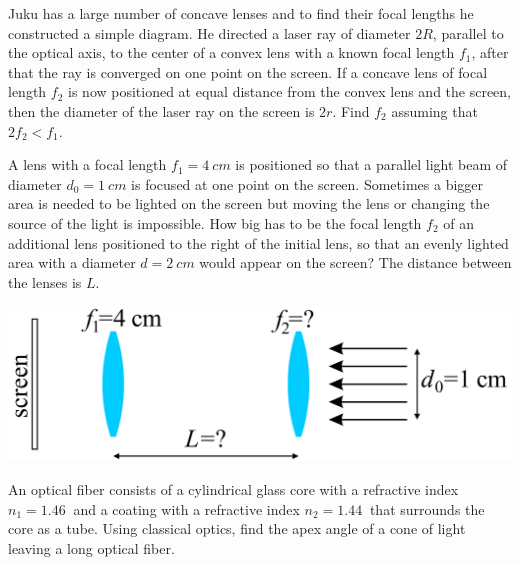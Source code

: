 \documentclass[11pt]{article}
\begin{document}

\probeng
Juku has a large number of concave lenses and to find their focal lengths he constructed a simple diagram. He directed a laser ray of diameter $2R$, parallel to the optical axis, to the center of a convex lens with a known focal length $f_1$, after that the ray is converged on one point on the screen. If a concave lens of focal length $f_2$ is now positioned at equal distance from the convex lens and the screen, then the diameter of the laser ray on the screen is $2r$. Find $f_2$ assuming that $2f_2 < f_1$.
\probend
\bigskip


\probeng
A lens with a focal length $f_1=\SI{4}{cm}$ is positioned so that a parallel light beam of diameter $d_0=\SI{1}{cm}$ is focused at one point on the screen. Sometimes a bigger area is needed to be lighted on the screen but moving the lens or changing the source of the light is impossible. How big has to be the focal length $f_2$ of an additional lens positioned to the right of the initial lens, so that an evenly lighted area with a diameter $d=\SI{2}{cm}$ would appear on the screen? The distance between the lenses is $L$.
\begin{center}
\includegraphics[scale=1.5]{2015-v3g-02-valgustamine-yles_ing}
\end{center}
\probend
\bigskip


\probeng
An optical fiber consists of a cylindrical glass core with a refractive index $n_1=\SI{1,46}{}$ and a coating with a refractive index $n_2=\SI{1,44}{}$ that surrounds the core as a tube. Using classical optics, find the apex angle of a cone of light leaving a long optical fiber.
\probend
\bigskip
\end{document}
